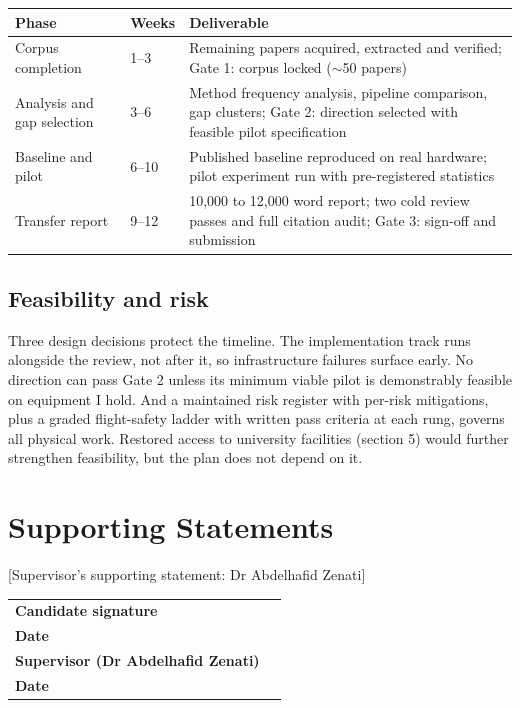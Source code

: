 \documentclass[11pt,a4paper]{article}
\begin{document}
\begin{tabularx}{\textwidth}{@{}p{4.6cm}p{1.8cm}X@{}}
  \toprule
  \textbf{Phase} & \textbf{Weeks} & \textbf{Deliverable} \\
  \midrule
  Corpus completion & 1--3 & Remaining papers acquired, extracted and verified; Gate 1: corpus locked ($\sim$50 papers) \\
  Analysis and gap selection & 3--6 & Method frequency analysis, pipeline comparison, gap clusters; Gate 2: direction selected with feasible pilot specification \\
  Baseline and pilot & 6--10 & Published baseline reproduced on real hardware; pilot experiment run with pre-registered statistics \\
  Transfer report & 9--12 & 10,000 to 12,000 word report; two cold review passes and full citation audit; Gate 3: sign-off and submission \\
  \bottomrule
\end{tabularx}

\subsection{Feasibility and risk}

Three design decisions protect the timeline. The implementation track runs alongside the review, not after it, so infrastructure failures surface early. No direction can pass Gate 2 unless its minimum viable pilot is demonstrably feasible on equipment I hold. And a maintained risk register with per-risk mitigations, plus a graded flight-safety ladder with written pass criteria at each rung, governs all physical work. Restored access to university facilities (section 5) would further strengthen feasibility, but the plan does not depend on it.

\section{Supporting Statements}

[Supervisor's supporting statement: Dr Abdelhafid Zenati]

\vspace{1.2cm}
\noindent
\begin{tabularx}{\textwidth}{@{}>{\bfseries}p{6.5cm}X@{}}
  \toprule
  Candidate signature & \\[10pt]
  Date & \\[10pt]
  Supervisor (Dr Abdelhafid Zenati) & \\[10pt]
  Date & \\
  \bottomrule
\end{tabularx}
\end{document}

